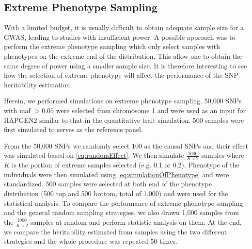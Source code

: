 		\subsection{Extreme Phenotype Sampling}
		With a limited budget, it is usually difficult to obtain adequate sample size for a \gls{GWAS}, leading to studies with insufficient power.
		A possible approach was to perform the extreme phenotype sampling which only select samples with phenotypes on the extreme end of the distribution.
		This allow one to obtain the same degree of power using a smaller sample size.
		It is therefore interesting to see how the selection of extreme phenotype will affect the performance of the \gls{SNP} heritability estimation.
		
		Herein, we performed simulations on extreme phenotype sampling.
		50,000 \glspl{SNP} with \gls{maf} $>0.05$ were selected from chromosome 1 and were used as an input for HAPGEN2 similar to that in the quantitative trait simulation.
		500 samples were first simulated to serves as the reference panel. 
		
		From the 50,000 \glspl{SNP} we randomly select 100 as the causal \glspl{SNP} and their effect was simulated based on \cref{eq:randomEffect}.
		We then simulate $\frac{1000}{K\times2}$ samples where $K$ is the portion of extreme samples selected (e.g. 0.1 or 0.2).
		Phenotype of the individuals were then simulated using \cref{eq:simulationOfPhenotype} and were standardized.
		500 samples were selected at both end of the phenotype distribution (500 top and 500 bottom, total of 1,000) and were used for the statistical analysis. 
		To compare the performance of extreme phenotype sampling and the general random sampling strategies, we also drawn 1,000 samples from the $\frac{1000}{K\times2}$ samples at random and perform statistic analysis on them.
		At the end, we compare the heritability estimated from samples using the two different strategies and the whole procedure was repeated 50 times. 
		

